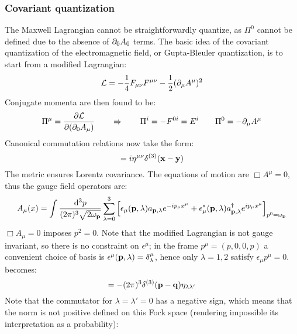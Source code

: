 \subsubsection{Covariant quantization}

The Maxwell Lagrangian  cannot be straightforwardly quantize, as $ \Pi^0 $ cannot be defined due to the absence of $ \partial_0 A_0 $ terms. The basic idea of the covariant quantization of the electromagnetic field, or Gupta-Bleuler quantization, is to start from a modified Lagrangian:
\begin{equation}
  \mathcal{L} = - \frac{1}{4} F_{\mu \nu} F^{\mu \nu} - \frac{1}{2} (\partial_\mu A^\mu)^2
\end{equation}
Conjugate momenta are then found to be:
\begin{equation*}
  \Pi^\mu = \frac{\partial \mathcal{L}}{\partial (\partial_0 A_\mu)}
  \qquad \Rightarrow \qquad
  \Pi^i = - F^{0i} = E^i
  \qquad
  \Pi^0 = - \partial_\mu A^\mu
\end{equation*}
Canonical commutation relations now take the form:
\begin{equation}
  [A^\mu(t,\ve{x}) , \Pi^\nu(t,\ve{y})] = i \eta^{\mu \nu} \delta^{(3)}(\ve{x} - \ve{y})
  \label{eq:qed-canon-comm-rel-1}
\end{equation}
The metric ensures Lorentz covariance. The equations of motion are $ \Box A^\mu = 0 $, thus the gauge field operators are:
\begin{equation}
  A_\mu(x) = \int \frac{\mathrm{d}^3p}{(2\pi)^3 \sqrt{2\omega_{\mathbf{p}}}} \sum_{\lambda = 0}^{3} \left[ \epsilon_\mu(\mathbf{p},\lambda) a_{\mathbf{p},\lambda} e^{-i p_\mu x^\mu} + \epsilon_\mu^*(\mathbf{p},\lambda) a_{\mathbf{p},\lambda}^\dagger e^{i p_\mu x^\mu} \right]_{p^0 = \omega_{\mathbf{p}}}
  \label{eq:qed-gauge-fourier}
\end{equation}
$ \Box A_\mu = 0 $ imposes $ p^2 = 0 $. Note that the modified Lagrangian is not gauge invariant, so there is no constraint on $ \epsilon^\mu $; in the frame $ p^\mu = (p,0,0,p) $ a convenient choice of basis is $ \epsilon^\mu(\mathbf{p},\lambda) = \delta^\mu_\lambda $, hence only $ \lambda = 1,2 $ satisfy $ \epsilon_\mu p^\mu = 0 $.  becomes:
\begin{equation}
  [a_{\ve{p},\lambda} , a_{\ve{p},\lambda'}\dg] = - (2\pi)^3 \delta^{(3)}(\ve{p} - \ve{q}) \eta_{\lambda \lambda'}
\end{equation}
Note that the commutator for $ \lambda = \lambda' = 0 $ has a negative sign, which means that the norm is not positive defined on this Fock space (rendering impossible its interpretation as a probability):
